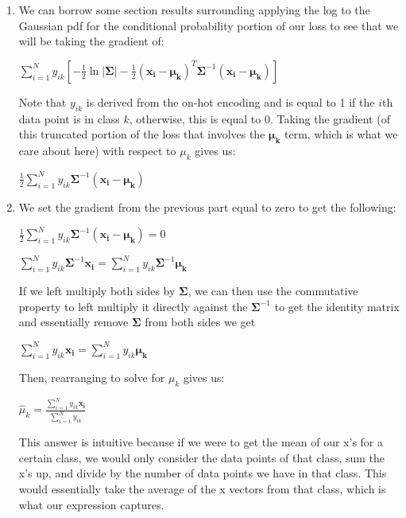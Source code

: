 \documentclass[submit]{harvardml}
\begin{document}
\begin{enumerate}
     \item We can borrow some section results surrounding applying the log to the Gaussian pdf for the conditional probability portion of our loss to see that we will be taking the gradient of:
     
     $\sum_{i=1}^N y_{ik}[-\frac{1}{2}\ln |\boldsymbol{\Sigma}| - \frac{1}{2}(\boldsymbol{x_i} - \boldsymbol{\mu_k})^T \boldsymbol{\Sigma}^{-1}(\boldsymbol{x_i} - \boldsymbol{\mu_k})]$
     
     Note that $y_{ik}$ is derived from the on-hot encoding and is equal to 1 if the $i$th data point is in class $k$, otherwise, this is equal to 0. Taking the gradient (of this truncated portion of the loss that involves the $\boldsymbol{\mu_k}$ term, which is what we care about here) with respect to $\mu_k$ gives us:
     
     $\frac{1}{2}\sum_{i=1}^N y_{ik} \boldsymbol{\Sigma}^{-1}(\boldsymbol{x_i} - \boldsymbol{\mu_k})$
     
     \item We set the gradient from the previous part equal to zero to get the following:
     
     $\frac{1}{2}\sum_{i=1}^N y_{ik} \boldsymbol{\Sigma}^{-1}(\boldsymbol{x_i} - \boldsymbol{\mu_k}) = 0$
     
     $\sum_{i=1}^N y_{ik} \boldsymbol{\Sigma}^{-1}\boldsymbol{x_i}  = \sum_{i=1}^N y_{ik} \boldsymbol{\Sigma}^{-1} \boldsymbol{\mu_k}$
     
     If we left multiply both sides by $\boldsymbol{\Sigma}$, we can then use the commutative property to left multiply it directly against the $\boldsymbol{\Sigma}^{-1}$ to get the identity matrix and essentially remove $\boldsymbol{\Sigma}$ from both sides we get
     
     $\sum_{i=1}^N y_{ik} \boldsymbol{x_i}  = \sum_{i=1}^N y_{ik} \boldsymbol{\mu_k}$
     
     Then, rearranging to solve for $\mu_k$ gives us:
     
     $\hat{\mu}_k = \frac{\sum_{i=1}^N y_{ik} \boldsymbol{x_i}}{\sum_{i=1}^N y_{ik} }$
     
     This answer is intuitive because if we were to get the mean of our x's for a certain class, we would only consider the data points of that class, sum the x's up, and divide by the number of data points we have in that class. This would essentially take the average of the x vectors from that class, which is what our expression captures. 
     

\end{enumerate}
\end{document}
